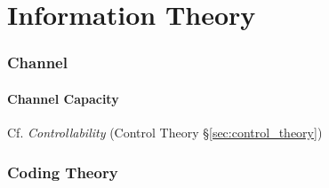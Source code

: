 \part{Information Theory}\label{part:information_theory} \cite{shannon48}

\section{Channel}\label{sec:channel}

\subsection{Channel Capacity}\label{sec:channel_capacity}

\fist Cf. \emph{Controllability} (Control Theory
\S\ref{sec:control_theory})



\section{Coding Theory}\label{sec:coding_theory}
